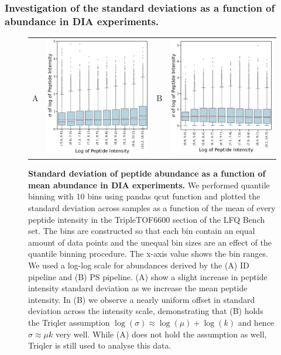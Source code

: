 \documentclass[11pt]{article}
\begin{document}
\subsubsection*{Investigation of the standard deviations as a function of abundance in DIA experiments.}
\begin{figure}[hbt]
    \centering
    \centering
    \begin{tabular}{lclc} 
        A & \includegraphics[width=0.5\linewidth]{../../result/report_plots_pipeline/quantile_bins_ID_median.png} &
        B & \includegraphics[width=0.5\linewidth]{../../result/report_plots_pipeline/quantile_bins_PS_median.png} \\
    \end{tabular}
  \caption{{\bf Standard deviation of peptide abundance as a function of mean abundance in DIA experiments.} We performed quantile binning with 10 bins using pandas qcut function and plotted the standard deviation across samples as a function of the mean of every peptide intensity in the TripleTOF6600 section of the LFQ Bench set. The bins are constructed so that each bin contain an equal amount of data points and the unequal bin sizes are an effect of the quantile binning procedure. The x-axis value shows the bin ranges. We used a log-log scale for abundances derived by the (A) ID pipeline and (B) PS pipeline. (A) show a slight increase in peptide intensity standard deviation as we increase the mean peptide intensity. In (B) we observe a nearly uniform offset in standard deviation across the intensity scale, demonstrating that (B) holds the Triqler assumption $\log(\sigma) \approx \log(\mu) + \log(k)$ and hence   $\sigma \approx \mu k$ very well. While (A) does not hold the assumption as well, Triqler is still used to analyse this data.  \label{fig:uniform_offset_in_standard_deviation_boxplot}}
\end{figure}
\end{document}
